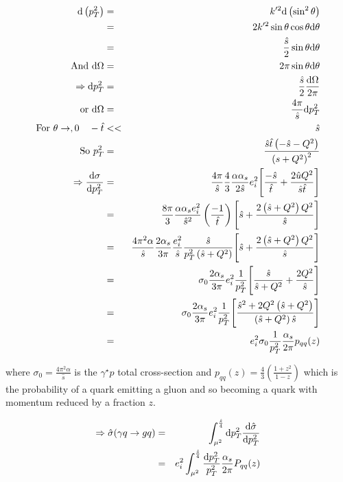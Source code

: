 \begin{eqnarray*}
  \mathrm{d}\left(p_T^2\right) & = & k'^2\mathrm{d}\left(\sin^2\theta\right) \\
  & = & 2k'^2\sin\theta\cos\theta\mathrm{d}\theta \\
  & = & \frac{\hat{s}}{2}\sin\theta\mathrm{d}\theta \\
  \textrm{And } \mathrm{d}\Omega & = & 2\pi\sin\theta\mathrm{d}\theta \\
  \Rightarrow \mathrm{d}p_T^2 & = & \frac{\hat{s}}{2}\frac{\mathrm{d}\Omega}{2\pi} \\
  \textrm{or } \mathrm{d}\Omega & = & \frac{4\pi}{\hat{s}}\mathrm{d}p_T^2 \\
  \textrm{For } \theta \to , 0 \quad  -\hat{t} & << & \hat{s} \\
  \textrm{So } p_T^2 & = & \frac{\hat{s}\hat{t}\left(-\hat{s}-Q^2\right)}{\left(s + Q^2\right)^2} \\
  \Rightarrow \frac{\mathrm{d}\sigma}{\mathrm{d}p_T^2} & = & \frac{4\pi}{\hat{s}}\frac{4}{3}\frac{\alpha\alpha_s}{2\hat{s}}e_i^2\Bigg[\frac{-\hat{s}}{\hat{t}} + \frac{2\hat{u}Q^2}{\hat{s}\hat{t}}\Bigg] \\
  & = & \frac{8\pi}{3}\frac{\alpha\alpha_se_i^2}{\hat{s}^2}\left(\frac{-1}{\hat{t}}\right)\Bigg[\hat{s} + \frac{2\left(\hat{s} + Q^2\right)Q^2}{\hat{s}}\Bigg] \\
  & = & \frac{4\pi^2\alpha}{\hat{s}}\frac{2\alpha_s}{3\pi}\frac{e_i^2}{\hat{s}}\frac{\hat{s}}{p_T^2\left(\hat{s} + Q^2\right)}\Bigg[ \hat{s} + \frac{2\left(\hat{s} + Q^2\right)Q^2}{\hat{s}}\Bigg] \\
  & = & \sigma_0 \frac{2\alpha_s}{3\pi}e_i^2\frac{1}{p_T^2}\Bigg[\frac{\hat{s}}{\hat{s}+Q^2} + \frac{2Q^2}{\hat{s}} \Bigg] \\
  & = & \sigma_0\frac{2\alpha_s}{3\pi}e_i^2\frac{1}{p_T^2}\Bigg[\frac{\hat{s}^2 + 2Q^2\left(\hat{s} + Q^2\right)}{\left(\hat{s} + Q^2\right)\hat{s}}\Bigg] \\
  & = & e_i^2\sigma_0\frac{1}{p_T^2}\frac{\alpha_s}{2\pi}p_{qq}(z)
\end{eqnarray*}

where $\sigma_0 = \frac{4\pi^2\alpha}{\hat{s}}$ is the $\gamma^{\star} p$ total cross-section and $p_{qq}(z) = \frac{4}{3}\left(\frac{1 + z^2}{1 - z}\right)$ which is the probability of a quark emitting a gluon and so becoming a quark with momentum reduced by a fraction $z$.

\begin{eqnarray*}
  \Rightarrow \hat{\sigma}(\gamma q \to gq) & = & \int_{\mu^2}^{\frac{\hat{s}}{4}}\mathrm{d}p_T^2\frac{\mathrm{d}\hat{\sigma}}{\mathrm{d}p_T^2} \\
  & = & e_i^2 \int_{\mu^2}^{\frac{\hat{s}}{4}}\frac{\mathrm{d}p_T^2}{p_T^2}\frac{\alpha_s}{2\pi}P_{qq}(z)
\end{eqnarray*}


